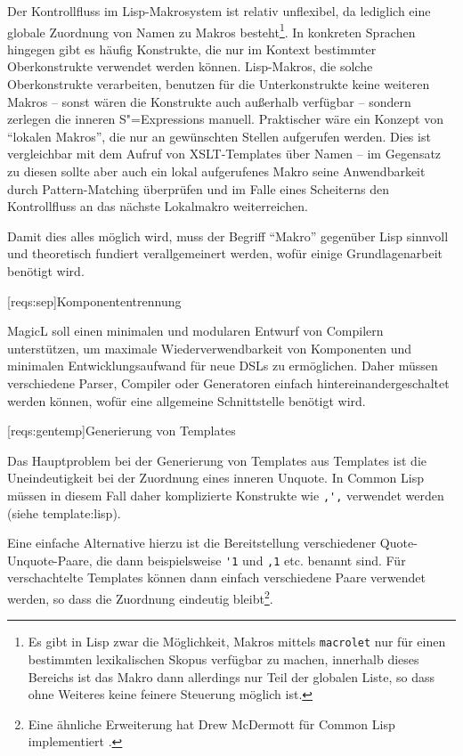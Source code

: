 \documentclass[12pt, a4paper, bibgerm]{scrbook}
\newcommand\icode[1]{\lstinline?#1?}
\newcommand\lsection{}
\newcommand\sref{}
\newcommand{\sees}[1]{(siehe \sref{#1})}
\newcommand{\sexps}{S"=Expressions}
\begin{document}
Der Kontrollfluss im Lisp-Makrosystem ist relativ unflexibel,
da lediglich eine globale Zuordnung von Namen zu Makros
besteht\footnote{Es gibt in Lisp zwar die Möglichkeit, Makros mittels
  \icode{macrolet} nur für einen bestimmten lexikalischen Skopus
  verfügbar zu machen, innerhalb dieses Bereichs ist das Makro dann
  allerdings nur Teil der globalen Liste, so dass ohne Weiteres keine
  feinere Steuerung möglich ist.}. In konkreten Sprachen hingegen gibt
es häufig Konstrukte, die nur im Kontext bestimmter Oberkonstrukte
verwendet werden können. Lisp-Makros, die solche Oberkonstrukte
verarbeiten, benutzen für die Unterkonstrukte keine weiteren Makros --
sonst wären die Konstrukte auch außerhalb verfügbar -- sondern zerlegen
die inneren \sexps{} manuell. Praktischer wäre ein Konzept von "`lokalen
Makros"', die nur an gewünschten Stellen aufgerufen werden. Dies ist
vergleichbar mit dem Aufruf von XSLT-Templates über Namen -- im Gegensatz
zu diesen sollte aber auch ein lokal aufgerufenes Makro seine
Anwendbarkeit durch Pattern-Matching überprüfen und im Falle eines
Scheiterns den Kontrollfluss an das nächste Lokalmakro weiterreichen.

Damit dies alles möglich wird, muss der Begriff ``Makro'' gegenüber Lisp
sinnvoll und theoretisch fundiert verallgemeinert werden, wofür einige
Grundlagenarbeit benötigt wird.

\lsection[reqs:sep]{Komponententrennung}

MagicL soll einen minimalen und modularen Entwurf von Compilern
unterstützen, um maximale Wiederverwendbarkeit von Komponenten und
minimalen Entwicklungsaufwand für neue DSLs zu ermöglichen. Daher müssen
verschiedene Parser, Compiler oder Generatoren einfach
hintereinandergeschaltet werden können, wofür eine allgemeine
Schnittstelle benötigt wird.

\lsection[reqs:gentemp]{Generierung von Templates}

Das Hauptproblem bei der Generierung von Templates aus Templates ist die
Uneindeutigkeit bei der Zuordnung eines inneren Unquote. In Common Lisp
müssen in diesem Fall daher komplizierte Konstrukte wie \icode{,',}
verwendet werden \sees{template:lisp}. 

Eine einfache Alternative hierzu ist die Bereitstellung verschiedener
Quote-Unquote-Paare, die dann beispielsweise \icode{'1} und \icode{,1}
etc. benannt sind. Für verschachtelte Templates können dann einfach
verschiedene Paare verwendet werden, so dass die Zuordnung eindeutig
bleibt\footnote{Eine ähnliche Erweiterung hat Drew McDermott für
Common Lisp implementiert \cite[S.21ff]{YTools}.}. 
\end{document}
